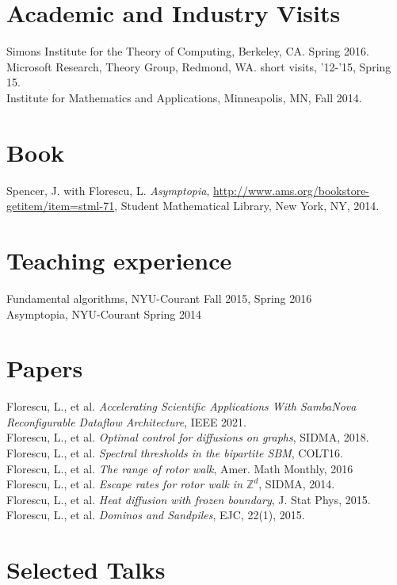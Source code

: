 \documentclass[margin,line]{res}
\begin{document}
\begin{resume}
\section{\sc Academic and Industry Visits}
{Simons Institute for the Theory of Computing}, Berkeley, CA. Spring 2016. \\
{Microsoft Research, Theory Group}, Redmond, WA. short visits, '12-'15, Spring 15. \\
{Institute for Mathematics and Applications}, Minneapolis, MN, Fall 2014.
\vspace*{-.2in}
\\

\section{\sc Book}
Spencer, J. with Florescu, L. \emph{Asymptopia}, \url{http://www.ams.org/bookstore-getitem/item=stml-71}, Student Mathematical Library, New York, NY, 2014.

\section{\sc Teaching experience}
Fundamental algorithms, NYU-Courant \hfill {Fall 2015, Spring 2016}\\
Asymptopia, NYU-Courant \hfill {Spring 2014}

\section{\sc Papers}
Florescu, L., et al. \emph{Accelerating Scientific Applications With SambaNova Reconfigurable Dataflow Architecture}, IEEE 2021. \\
Florescu, L., et al. \emph{Optimal control for diffusions on graphs}, SIDMA, 2018. \\
Florescu, L., et al. \emph{Spectral thresholds in the bipartite SBM}, COLT16.\\
Florescu, L., et al. \emph{The range of rotor walk}, Amer. Math Monthly, 2016\\
Florescu, L., et al. \emph{Escape rates for rotor walk in $\mathbb{Z}^d$}, SIDMA, 2014.\\ 
Florescu, L., et al. \emph{Heat diffusion with frozen boundary}, J. Stat Phys, 2015. \\
Florescu, L., et al. \emph{Dominos and Sandpiles}, EJC, 22(1), 2015.

\section{\sc Selected Talks}


\end{resume}
\end{document}
